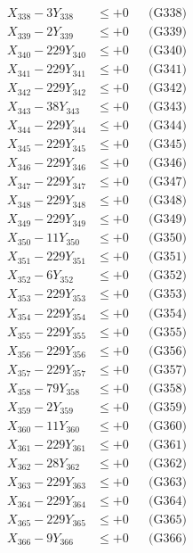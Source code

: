 \documentclass[a4paper,10pt]{article}
\begin{document}
{\begin{align}
X_{338} - 3Y_{338} &\leq +0 && \text{(G338)} \\
X_{339} - 2Y_{339} &\leq +0 && \text{(G339)} \\
X_{340} - 229Y_{340} &\leq +0 && \text{(G340)} \\
\allowbreak
X_{341} - 229Y_{341} &\leq +0 && \text{(G341)} \\
X_{342} - 229Y_{342} &\leq +0 && \text{(G342)} \\
X_{343} - 38Y_{343} &\leq +0 && \text{(G343)} \\
X_{344} - 229Y_{344} &\leq +0 && \text{(G344)} \\
X_{345} - 229Y_{345} &\leq +0 && \text{(G345)} \\
X_{346} - 229Y_{346} &\leq +0 && \text{(G346)} \\
X_{347} - 229Y_{347} &\leq +0 && \text{(G347)} \\
X_{348} - 229Y_{348} &\leq +0 && \text{(G348)} \\
X_{349} - 229Y_{349} &\leq +0 && \text{(G349)} \\
X_{350} - 11Y_{350} &\leq +0 && \text{(G350)} \\
\allowbreak
X_{351} - 229Y_{351} &\leq +0 && \text{(G351)} \\
X_{352} - 6Y_{352} &\leq +0 && \text{(G352)} \\
X_{353} - 229Y_{353} &\leq +0 && \text{(G353)} \\
X_{354} - 229Y_{354} &\leq +0 && \text{(G354)} \\
X_{355} - 229Y_{355} &\leq +0 && \text{(G355)} \\
X_{356} - 229Y_{356} &\leq +0 && \text{(G356)} \\
X_{357} - 229Y_{357} &\leq +0 && \text{(G357)} \\
X_{358} - 79Y_{358} &\leq +0 && \text{(G358)} \\
X_{359} - 2Y_{359} &\leq +0 && \text{(G359)} \\
X_{360} - 11Y_{360} &\leq +0 && \text{(G360)} \\
\allowbreak
X_{361} - 229Y_{361} &\leq +0 && \text{(G361)} \\
X_{362} - 28Y_{362} &\leq +0 && \text{(G362)} \\
X_{363} - 229Y_{363} &\leq +0 && \text{(G363)} \\
X_{364} - 229Y_{364} &\leq +0 && \text{(G364)} \\
X_{365} - 229Y_{365} &\leq +0 && \text{(G365)} \\
X_{366} - 9Y_{366} &\leq +0 && \text{(G366)} \\

\end{align}}
\end{document}
